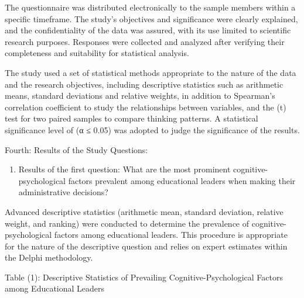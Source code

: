 \documentclass[10pt]{NSP1}
\begin{document}
\par\medskip{}\smallskip

The questionnaire was distributed electronically to the sample members within a specific timeframe. The study's objectives and significance were clearly explained, and the confidentiality of the data was assured, with its use limited to scientific research purposes. Responses were collected and analyzed after verifying their completeness and suitability for statistical analysis.

\par\medskip{}\smallskip

The study used a set of statistical methods appropriate to the nature of the data and the research objectives, including descriptive statistics such as arithmetic means, standard deviations and relative weights, in addition to Spearman's correlation coefficient to study the relationships between variables, and the (t) test for two paired samples to compare thinking patterns. A statistical significance level of (α ≤ 0.05) was adopted to judge the significance of the results.

Fourth: Results of the Study Questions:

\begin{enumerate}
  \item Results of the first question: What are the most prominent cognitive-psychological factors prevalent among educational leaders when making their administrative decisions?
\end{enumerate}

Advanced descriptive statistics (arithmetic mean, standard deviation, relative weight, and ranking) were conducted to determine the prevalence of cognitive-psychological factors among educational leaders. This procedure is appropriate for the nature of the descriptive question and relies on expert estimates within the Delphi methodology.

Table (1): Descriptive Statistics of Prevailing Cognitive-Psychological Factors among Educational Leaders
\end{document}
